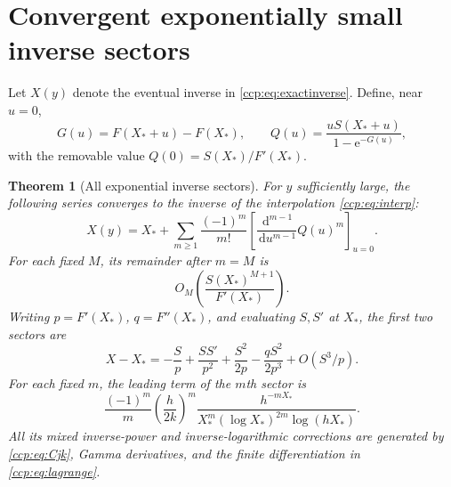 \documentclass[11pt,letterpaper]{article}
\newtheorem{theorem}{Theorem}[section]
\theoremstyle{remark}\newtheorem{remark}[theorem]{Remark}
\newcommand{\dd}{\,\mathrm d}
\newcommand{\ee}{\mathrm e}
\begin{document}
\section{Convergent exponentially small inverse sectors}
Let $X(y)$ denote the eventual inverse in \eqref{ccp:eq:exactinverse}. Define, near $u=0$,
\begin{equation}
G(u)=F(X_*+u)-F(X_*),\qquad
Q(u)=\frac{uS(X_*+u)}{1-\ee^{-G(u)}},\label{ccp:eq:Q}
\end{equation}
with the removable value $Q(0)=S(X_*)/F'(X_*)$.

\begin{theorem}[All exponential inverse sectors]\label{ccp:thm:inverse}
For $y$ sufficiently large, the following series converges to the inverse of the interpolation \eqref{ccp:eq:interp}:
\begin{equation}
X(y)=X_*+\sum_{m\ge1}\frac{(-1)^m}{m!}
 \left[\frac{\dd^{m-1}}{\dd u^{m-1}}Q(u)^m\right]_{u=0}.\label{ccp:eq:lagrange}
\end{equation}
For each fixed $M$, its remainder after $m=M$ is
\begin{equation}
O_M\left(\frac{S(X_*)^{M+1}}{F'(X_*)}\right).\label{ccp:eq:inverseerror}
\end{equation}
Writing $p=F'(X_*)$, $q=F''(X_*)$, and evaluating $S,S'$ at $X_*$, the first two sectors are
\begin{equation}
X-X_*=-\frac Sp+\frac{SS'}{p^2}+\frac{S^2}{2p}
                    -\frac{qS^2}{2p^3}+O(S^3/p).\label{ccp:eq:twosectors}
\end{equation}
For each fixed $m$, the leading term of the $m$th sector is
\begin{equation}
\frac{(-1)^m}{m}\left(\frac h{2k}\right)^m
 \frac{h^{-mX_*}}{X_*^m(\log X_*)^{2m}\log(hX_*)}.\label{ccp:eq:msector}
\end{equation}
All its mixed inverse-power and inverse-logarithmic corrections are generated by \eqref{ccp:eq:Cjk}, Gamma derivatives, and the finite differentiation in \eqref{ccp:eq:lagrange}.
\end{theorem}
\end{document}
